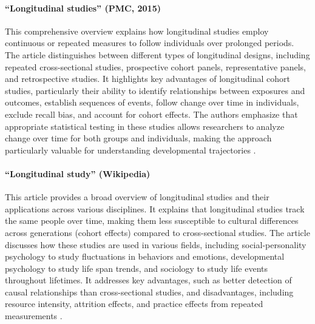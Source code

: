 \documentclass[../main.tex]{subfiles}
\begin{document}

\paragraph{``Longitudinal studies'' (PMC, 2015)}
This comprehensive overview explains how longitudinal studies employ continuous or repeated measures to follow individuals over prolonged periods. The article distinguishes between different types of longitudinal designs, including repeated cross-sectional studies, prospective cohort panels, representative panels, and retrospective studies. It highlights key advantages of longitudinal cohort studies, particularly their ability to identify relationships between exposures and outcomes, establish sequences of events, follow change over time in individuals, exclude recall bias, and account for cohort effects. The authors emphasize that appropriate statistical testing in these studies allows researchers to analyze change over time for both groups and individuals, making the approach particularly valuable for understanding developmental trajectories \cite{caruana2015longitudinal}.

\paragraph{``Longitudinal study'' (Wikipedia)}
This article provides a broad overview of longitudinal studies and their applications across various disciplines. It explains that longitudinal studies track the same people over time, making them less susceptible to cultural differences across generations (cohort effects) compared to cross-sectional studies. The article discusses how these studies are used in various fields, including social-personality psychology to study fluctuations in behaviors and emotions, developmental psychology to study life span trends, and sociology to study life events throughout lifetimes. It addresses key advantages, such as better detection of causal relationships than cross-sectional studies, and disadvantages, including resource intensity, attrition effects, and practice effects from repeated measurements \cite{wikipedia2024longitudinal}.
\end{document}
